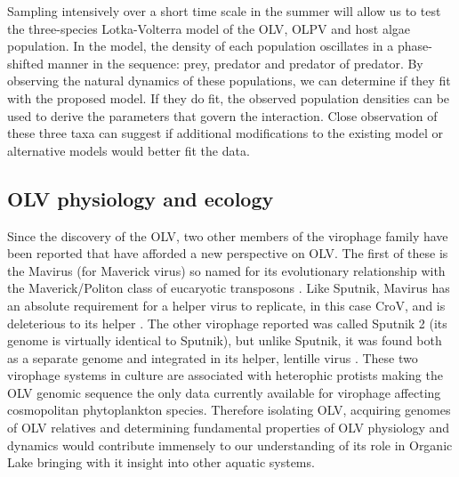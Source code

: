 Sampling intensively over a short time scale in the summer will allow us to test the three-species Lotka-Volterra model of the \ac{OLV}, \ac{OLPV} and host algae population.
In the model, the density of each population oscillates in a phase-shifted manner in the sequence: prey, predator and predator of predator.
By observing the natural dynamics of these populations, we can determine if they fit with the proposed model.
If they do fit, the observed population densities can be used to derive the parameters that govern the interaction.
Close observation of these three taxa can suggest if additional modifications to the existing model or alternative models would better fit the data.

\subsection{\acs{OLV} physiology and ecology}
Since the discovery of the \ac{OLV}, two other members of the virophage family have been reported that have afforded a new perspective on \ac{OLV}.
The first of these is the Mavirus (for Maverick virus) so named for its evolutionary relationship with the Maverick/Politon class of eucaryotic transposons \cite{Fischer2011a}.
Like Sputnik, Mavirus has an absolute requirement for a helper virus to replicate, in this case \ac{CroV}, and is deleterious to its helper \cite{Fischer2011a}.
The other virophage reported was called Sputnik 2 (its genome is virtually identical to Sputnik), but unlike Sputnik, it was found both as a separate genome and integrated in its helper, lentille virus \cite{Desnues2012}.
These two virophage systems in culture are associated with heterophic protists making the \ac{OLV} genomic sequence the only data currently available for virophage affecting cosmopolitan phytoplankton species.
Therefore isolating \ac{OLV}, acquiring genomes of \ac{OLV} relatives and determining fundamental properties of \ac{OLV} physiology and dynamics would contribute immensely to our understanding of its role in Organic Lake bringing with it insight into other aquatic systems.

